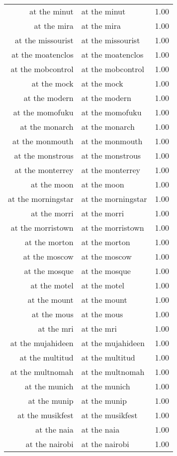 \begin{table}[ht]
\begin{tabular}{rlr}
  at the minut & at the minut & 1.00 \\ 
  at the mira & at the mira & 1.00 \\ 
  at the missourist & at the missourist & 1.00 \\ 
  at the moatenclos & at the moatenclos & 1.00 \\ 
  at the mobcontrol & at the mobcontrol & 1.00 \\ 
  at the mock & at the mock & 1.00 \\ 
  at the modern & at the modern & 1.00 \\ 
  at the momofuku & at the momofuku & 1.00 \\ 
  at the monarch & at the monarch & 1.00 \\ 
  at the monmouth & at the monmouth & 1.00 \\ 
  at the monstrous & at the monstrous & 1.00 \\ 
  at the monterrey & at the monterrey & 1.00 \\ 
  at the moon & at the moon & 1.00 \\ 
  at the morningstar & at the morningstar & 1.00 \\ 
  at the morri & at the morri & 1.00 \\ 
  at the morristown & at the morristown & 1.00 \\ 
  at the morton & at the morton & 1.00 \\ 
  at the moscow & at the moscow & 1.00 \\ 
  at the mosque & at the mosque & 1.00 \\ 
  at the motel & at the motel & 1.00 \\ 
  at the mount & at the mount & 1.00 \\ 
  at the mous & at the mous & 1.00 \\ 
  at the mri & at the mri & 1.00 \\ 
  at the mujahideen & at the mujahideen & 1.00 \\ 
  at the multitud & at the multitud & 1.00 \\ 
  at the multnomah & at the multnomah & 1.00 \\ 
  at the munich & at the munich & 1.00 \\ 
  at the munip & at the munip & 1.00 \\ 
  at the musikfest & at the musikfest & 1.00 \\ 
  at the naia & at the naia & 1.00 \\ 
  at the nairobi & at the nairobi & 1.00 \\ 

\end{tabular}
\end{table}
